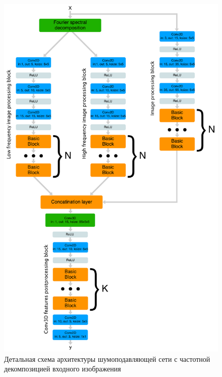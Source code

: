 \begin{figure}[h]
	\centering
	\includegraphics[width=\textwidth * 4 / 5]{img/architecture_fft_decomposition}
	\caption{Детальная схема архитектуры шумоподавляющей сети с частотной декомпозицией входного изображения}
	\label{fig:architecture_fft_decomposition}
\end{figure}

